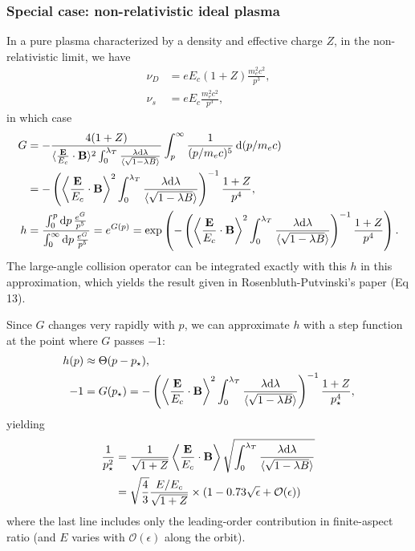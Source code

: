 \documentclass[11pt,a4paper]{article}
\newcommand{\rd}{\ensuremath{\mathrm{d}}}
\newcommand{\Ordo}{\ensuremath{\mathcal{O}}}%
\renewcommand{\b}[1]{\ensuremath{ {\bf #1 } }}
\begin{document}
\subsubsection*{Special case: non-relativistic ideal plasma}
In a pure plasma characterized by a density and effective charge $Z$, in the non-relativistic limit, we have
\begin{align}
\nu_D &= eE_c (1+Z)\frac{m_e^2 c^2}{p^3}, \nonumber \\
\nu_s &= eE_c  \frac{m_e^2 c^2}{p^3},
\end{align}
in which case
\begin{align}
G &= -\frac{ 4(1+Z)}{ \langle \frac{\b{E}}{E_c}\cdot\b{B}\rangle^2 \int_0^{\lambda_T} \frac{\lambda\rd\lambda}{\langle\sqrt{1-\lambda B}\rangle}}  \int_p^\infty \frac{1}{(p/m_e c)^5} \,\rd (p/m_ec) \nonumber \\
&= -\left(\left\langle \frac{\b{E}}{E_c}\cdot\b{B}\right\rangle^2 \int_0^{\lambda_T} \frac{\lambda\rd\lambda}{\langle\sqrt{1-\lambda B}\rangle}\right)^{-1}  \frac{1+Z}{p^4}, \nonumber \\
h &= \frac{\int_0^p \rd p \, \frac{e^G}{p^5}}{\int_0^\infty \rd p \, \frac{e^G}{p^5}}  %
= e^{G(p)} %
= \exp\left(-\left(\left\langle \frac{\b{E}}{E_c}\cdot\b{B}\right\rangle^2 \int_0^{\lambda_T} \frac{\lambda\rd\lambda}{\langle\sqrt{1-\lambda B}\rangle}\right)^{-1}  \frac{1+Z}{p^4} \right).
\end{align}
The large-angle collision operator can be integrated exactly with this $h$ in this approximation, which yields the result given in Rosenbluth-Putvinski's paper (Eq 13).

Since $G$ changes very rapidly with $p$, we can approximate $h$ with a step function at the point where $G$ passes $-1$:
\begin{align}
h(p) &\approx \Theta(p-p_\star),\nonumber \\
-1 &= G(p_\star) = -\left(\left\langle \frac{\b{E}}{E_c}\cdot\b{B}\right\rangle^2 \int_0^{\lambda_T} \frac{\lambda\rd\lambda}{\langle\sqrt{1-\lambda B}\rangle}\right)^{-1}  \frac{1+Z}{p_\star^4} ,
\end{align}
yielding
\begin{align}
\frac{1}{p_\star^2} &= \frac{1}{\sqrt{1+Z}} \left\langle \frac{\b{E}}{E_c}\cdot\b{B}\right\rangle \sqrt{ \int_0^{\lambda_T} \frac{\lambda\rd\lambda}{\langle\sqrt{1-\lambda B}\rangle}} \nonumber \\
&= \sqrt{\frac{4}{3}}\frac{E/E_c}{\sqrt{1+Z}} \times (1-0.73\sqrt{\epsilon} + \Ordo(\epsilon))
\end{align}
where the last line includes only the leading-order contribution in finite-aspect ratio (and $E$ varies with $\Ordo(\epsilon)$ along the orbit).
\end{document}
